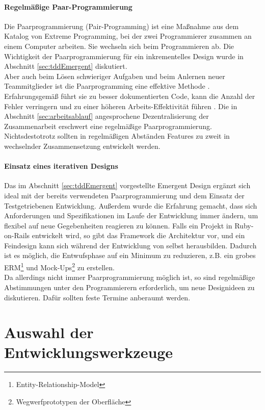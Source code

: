 \paragraph{Regelmäßige Paar-Programmierung} Die Paarprogrammierung (Pair-Programming) ist eine Maßnahme aus dem Katalog von Extreme Programming, bei der zwei Programmierer zusammen an einem Computer arbeiten. Sie wechseln sich beim Programmieren ab. Die Wichtigkeit der Paarprogrammierung für ein inkrementelles Design wurde in Abschnitt \ref{sec:tddEmergent} diskutiert.\\ Aber auch beim Lösen schwieriger Aufgaben und beim Anlernen neuer Teammitglieder ist die Paarprogramming eine effektive Methode \citep[S. 9]{hulkko_multiple_2005}. Erfahrungsgemäß führt sie zu besser dokumentierten Code, kann die Anzahl der Fehler verringern und zu einer höheren Arbeits-Effektivität führen \citep{hulkko_multiple_2005}.
Die in Abschnitt \ref{sec:arbeitsablauf} angesprochene Dezentralisierung der Zusammenarbeit erschwert eine regelmäßige Paarprogrammierung. Nichtsdestotrotz sollten in regelmäßigen Abständen Features zu zweit in wechselnder Zusammensetzung entwickelt werden.

\paragraph{Einsatz eines iterativen Designs} Das im Abschnitt \ref{sec:tddEmergent} vorgestellte Emergent Design ergänzt sich ideal mit der bereits verwendeten Paarprogrammierung und dem Einsatz der Testgetriebenen Entwicklung. Außerdem wurde die Erfahrung gemacht, dass sich Anforderungen und Spezifikationen im Laufe der Entwicklung immer ändern, um flexibel auf neue Gegebenheiten reagieren zu können. Falls ein Projekt in Ruby-on-Rails entwickelt wird, so gibt das Framework die Architektur vor, und ein Feindesign kann sich während der Entwicklung von selbst herausbilden. Dadurch ist es möglich, die Entwufsphase auf ein Minimum zu reduzieren, z.B. ein grobes ERM\footnote{Entity-Relationship-Model} und Mock-Ups\footnote{Wegwerfprototypen der Oberfläche} zu erstellen.\\
Da allerdings nicht immer Paarprogrammierung möglich ist, so sind regelmäßige Abstimmungen unter den Programmierern erforderlich, um neue Designideen zu diskutieren. Dafür sollten feste Termine anberaumt werden.


\section{Auswahl der Entwicklungswerkzeuge}
\label{sec:devtools}

